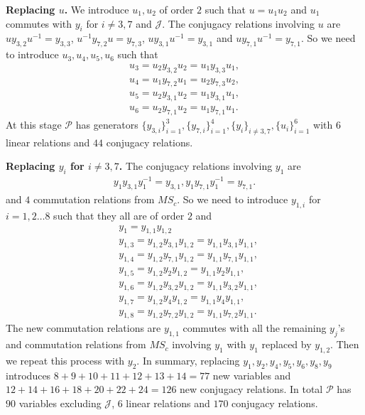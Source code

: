 \documentclass[11pt,letterpaper]{article}
\newcommand{\1}{\mathbb{1}}
\newcommand{\Pg}{\mathcal{P}}
\newcommand{\J}{\mathcal{J}}
\newcommand{\MS}{MS}
\theoremstyle{definition}
\begin{document}
\textbf{Replacing $u$.} We introduce $u_1, u_2$ of order $2$ such that $u = u_1u_2$ and $u_1$ commutes with
$y_i$ for $i \neq 3,7$ and $\J$.
The conjugacy relations involving $u$ are $uy_{3,2}u^{-1} = y_{3,3}$, $u^{-1}y_{7,2}u = y_{7,3}$,
$uy_{3,1}u^{-1} = y_{3,1}$ and $uy_{7,1}u^{-1} = y_{7,1}$. So we need to introduce $u_3,u_4,u_5,u_6$ such that 
\begin{align}
	u_3 = u_2y_{3,2}u_2 = u_1y_{3,3}u_1, \\
	u_4 = u_1y_{7,2}u_1 = u_2y_{7,3}u_2,\\
	u_5 = u_2y_{3,1}u_2 = u_1y_{3,1}u_1,\\
	u_6 = u_2y_{7,1}u_2 = u_1y_{7,1}u_1.
\end{align}
At this stage $\Pg$ has generators $\{y_{3,i}\}_{i=1}^3, \{ y_{7,i} \}_{i=1}^4, \{y_i\}_{i\neq 3, 7}, \{u_i\}_{i=1}^6$ with $6$ linear relations and $44$ conjugacy relations. 

\textbf{Replacing $y_i$ for $i \neq 3,7$.} The conjugacy relations involving $y_1$ are 
\begin{align}
	y_{1}y_{3,1} y_1^{-1} = y_{3,1},
	y_{1}y_{7,1}y_1^{-1} = y_{7,1}.
\end{align}
and $4$ commutation relations from $\MS_c$.
So we need to introduce $y_{1,i}$ for $i = 1, 2 \dots 8$ such that they all are of order $2$ and
\begin{align}
&y_1= y_{1,1} y_{1,2}\\
&y_{1,3} = y_{1,2} y_{3,1}y_{1,2} = y_{1,1} y_{3,1}y_{1,1},\\
&y_{1,4} = y_{1,2} y_{7,1}y_{1,2} = y_{1,1} y_{7,1}y_{1,1},\\
&y_{1,5} = y_{1,2} y_{2}y_{1,2} = y_{1,1} y_{2}y_{1,1},\\
&y_{1,6} = y_{1,2} y_{3,2}y_{1,2} = y_{1,1} y_{3,2}y_{1,1},\\
&y_{1,7} = y_{1,2} y_{4}y_{1,2} = y_{1,1} y_{4}y_{1,1},\\
&y_{1,8} = y_{1,2} y_{7,2}y_{1,2} = y_{1,1} y_{7,2}y_{1,1}.
\end{align}
The new commutation relations are $y_{1,1}$ commutes with all the remaining $y_j$'s
and commutation relations from $\MS_c$ involving $y_1$ with $y_1$ replaced by $y_{1,2}$.
Then we repeat this process with $y_2$.
In summary, replacing $y_1,y_2,y_4,y_5,y_6,y_8,y_9$ introduces $8+9+10+11+12+13+14 = 77$ new variables 
and $12+14+16+18+20+22+24 = 126$ new conjugacy relations. 
In total $\Pg$ has $90$ variables excluding $\J$, $6$ linear relations and $170$ conjugacy relations.
\end{document}
